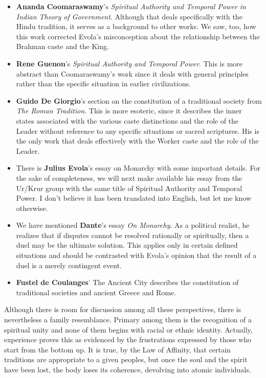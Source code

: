 \begin{itemize}


\item \textbf{Ananda Coomaraswamy}'s \textit{Spiritual Authority and Temporal Power in Indian Theory of Government}. Although that deals specifically with the Hindu tradition, it serves as a background to other works. We saw, too, how this work corrected Evola's misconception about the relationship between the Brahman caste and the King.

\item \textbf{Rene Guenon}'s \textit{Spiritual Authority and Temporal Power}. This is more abstract than Coomaraswamy's work since it deals with general principles rather than the specific situation in earlier civilizations.

\item \textbf{Guido De Giorgio}'s section on the constitution of a traditional society from \textit{The Roman Tradition}. This is more esoteric, since it describes the inner states associated with the various caste distinctions and the role of the Leader without reference to any specific situations or sacred scriptures. His is the only work that deals effectively with the Worker caste and the role of the Leader.

\item There is \textbf{Julius Evola}'s essay on Monarchy with some important details. For the sake of completeness, we will next make available his essay from the Ur/Krur group with the same title of Spiritual Authority and Temporal Power. I don't believe it has been translated into English, but let me know otherwise.

\item We have mentioned \textbf{Dante}'s essay \textit{On Monarchy}. As a political realist, he realizes that if disputes cannot be resolved rationally or spiritually, then a duel may be the ultimate solution. This applies only in certain defined situations and should be contrasted with Evola's opinion that the result of a duel is a merely contingent event.

\item \textbf{Fustel de Coulanges}' The Ancient City describes the constitution of traditional societies and ancient Greece and Rome.
\end{itemize}


Although there is room for discussion among all these perspectives, there is nevertheless a family resemblance. Primary among them is the recognition of a spiritual unity and none of them begins with racial or ethnic identity. Actually, experience proves this as evidenced by the frustrations expressed by those who start from the bottom up. It is true, by the Law of Affinity, that certain traditions are appropriate to a given peoples, but once the soul and the spirit have been lost, the body loses its coherence, devolving into atomic individuals.

